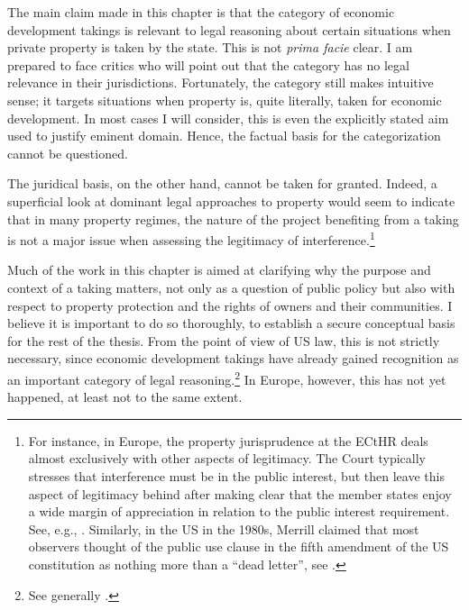 The main claim made in this chapter is that the category of economic development takings is relevant to legal reasoning about certain situations when private property is taken by the state. This is not {\it prima facie} clear. I am prepared to face critics who will point out that the category has no legal relevance in their jurisdictions. Fortunately, the category still makes intuitive sense; it targets situations when property is, quite literally, taken for economic development. In most cases I will consider, this is even the explicitly stated aim used to justify eminent domain. Hence, the factual basis for the categorization cannot be questioned.

The juridical basis, on the other hand, cannot be taken for granted. Indeed, a superficial look at dominant legal approaches to property would seem to indicate that in many property regimes, the nature of the project benefiting from a taking is not a major issue when assessing the legitimacy of interference.\footnote{For instance, in Europe, the property jurisprudence at the ECtHR deals almost exclusively with other aspects of legitimacy. The Court typically stresses that interference must be in the public interest, but then leave this aspect of legitimacy behind after making clear that the member states enjoy a wide margin of appreciation in relation to the public interest requirement. See, e.g., \cite{james86,lindheim12}. Similarly, in the US in the 1980s, Merrill claimed that most observers thought of the public use clause in the fifth amendment of the US constitution as nothing more than a ``dead letter'', see \cite[61]{merrill86}.} 

Much of the work in this chapter is aimed at clarifying why the purpose and context of a taking matters, not only as a question of public policy but also with respect to property protection and the rights of owners and their communities. I believe it is important to do so thoroughly, to establish a secure conceptual basis for the rest of the thesis. From the point of view of US law, this is not strictly necessary, since economic development takings have already gained recognition as an important category of legal reasoning.\footnote{See generally \cite{cohen06,somin07,malloy08}.} In Europe, however, this has not yet happened, at least not to the same extent.

